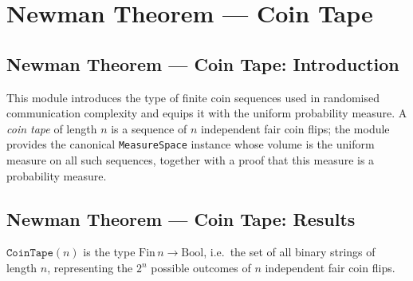 \section{Newman Theorem --- Coin Tape}
\subsection*{Newman Theorem --- Coin Tape: Introduction}

This module introduces the type of finite coin sequences used in randomised communication
complexity and equips it with the uniform probability measure.  A \emph{coin tape} of
length $n$ is a sequence of $n$ independent fair coin flips; the module provides the
canonical \texttt{MeasureSpace} instance whose volume is the uniform measure on all such
sequences, together with a proof that this measure is a probability measure.

\subsection*{Newman Theorem --- Coin Tape: Results}

\begin{definition}
\label{CommunicationComplexity.CoinTape}
\leanok
$\texttt{CoinTape}(n)$ is the type $\mathrm{Fin}\,n \to \mathrm{Bool}$, i.e.\ the set of
all binary strings of length $n$, representing the $2^n$ possible outcomes of $n$
independent fair coin flips.
\end{definition}
